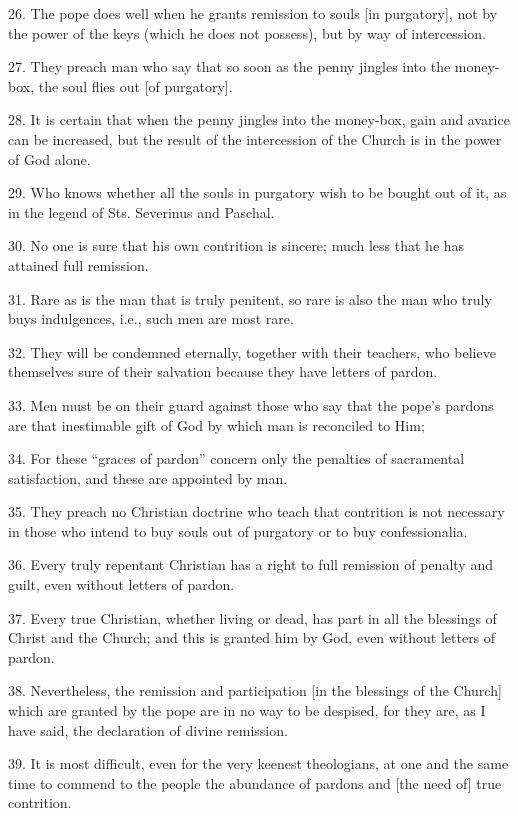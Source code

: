 26. The pope does well when he grants remission to souls [in
purgatory], not by the power of the keys (which he does not possess),
but by way of intercession.

27. They preach man who say that so soon as the penny jingles into the
money-box, the soul flies out [of purgatory].

28. It is certain that when the penny jingles into the money-box, gain
and avarice can be increased, but the result of the intercession of the
Church is in the power of God alone.

29. Who knows whether all the souls in purgatory wish to be bought out
of it, as in the legend of Sts. Severinus and Paschal.

30. No one is sure that his own contrition is sincere; much less that
he has attained full remission.

31. Rare as is the man that is truly penitent, so rare is also the man
who truly buys indulgences, i.e., such men are most rare.

32. They will be condemned eternally, together with their teachers, who
believe themselves sure of their salvation because they have letters of
pardon.

33. Men must be on their guard against those who say that the pope's
pardons are that inestimable gift of God by which man is reconciled to
Him;

34. For these ``graces of pardon'' concern only the penalties of
sacramental satisfaction, and these are appointed by man.

35. They preach no Christian doctrine who teach that contrition is not
necessary in those who intend to buy souls out of purgatory or to buy
confessionalia.

36. Every truly repentant Christian has a right to full remission of
penalty and guilt, even without letters of pardon.

37. Every true Christian, whether living or dead, has part in all the
blessings of Christ and the Church; and this is granted him by God,
even without letters of pardon.

38. Nevertheless, the remission and participation [in the blessings of
the Church] which are granted by the pope are in no way to be despised,
for they are, as I have said, the declaration of divine remission.

39. It is most difficult, even for the very keenest theologians, at one
and the same time to commend to the people the abundance of pardons and
[the need of] true contrition.

